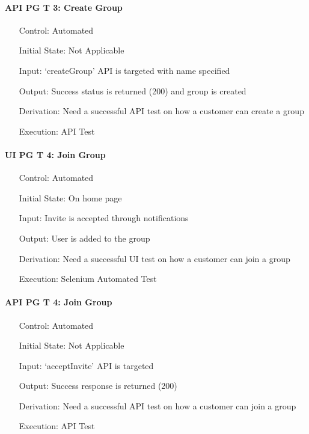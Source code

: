 \documentclass[12pt, titlepage]{article}
\begin{document}
\paragraph*{API PG T 3: Create Group}
\begin{itemize}
	\item[Control:] Automated
	\item[Initial State:] Not Applicable
	\item[Input:] `createGroup' API is targeted with name specified
	\item[Output:] Success status is returned (200) and group is created
	\item[Derivation:] Need a successful API test on how a customer can create a group
	\item[Execution:] API Test
\end{itemize}

\paragraph*{UI PG T 4: Join Group}
\begin{itemize}
	\item[Control:] Automated
	\item[Initial State:] On home page
	\item[Input:] Invite is accepted through notifications
	\item[Output:] User is added to the group
	\item[Derivation:] Need a successful UI test on how a customer can join a group
	\item[Execution:] Selenium Automated Test
\end{itemize}

\paragraph*{API PG T 4: Join Group}
\begin{itemize}
	\item[Control:] Automated
	\item[Initial State:] Not Applicable
	\item[Input:] `acceptInvite' API is targeted
	\item[Output:] Success response is returned (200)
	\item[Derivation:] Need a successful API test on how a customer can join a group
	\item[Execution:] API Test
\end{itemize}
\end{document}
